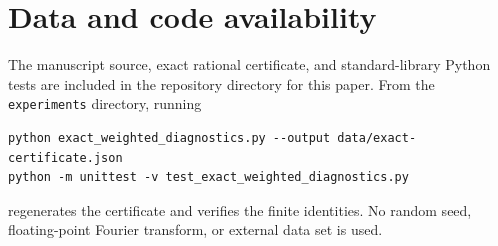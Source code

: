 \section*{Data and code availability}

The manuscript source, exact rational certificate, and standard-library Python tests are included in the repository directory for this paper.  From the \texttt{experiments} directory, running
\begin{verbatim}
python exact_weighted_diagnostics.py --output data/exact-certificate.json
python -m unittest -v test_exact_weighted_diagnostics.py
\end{verbatim}
regenerates the certificate and verifies the finite identities.  No random seed, floating-point Fourier transform, or external data set is used.
